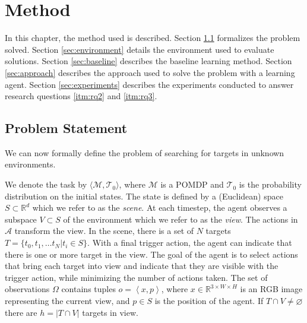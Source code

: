 \chapter{Method}
\label{cha:method}


% 

In this chapter, the method used is described.
Section \ref{sec:problem} formalizes the problem solved.
Section \ref{sec:environment} details the environment used to evaluate solutions.
Section \ref{sec:baseline} describes the baseline learning method.
Section \ref{sec:approach} describes the approach used to solve the problem with a learning agent.
Section \ref{sec:experiments} describes the experiments conducted to answer research questions \ref{itm:rq2} and \ref{itm:rq3}.

\section{Problem Statement}
\label{sec:problem}


We can now formally define the problem of searching for targets in unknown environments.

We denote the task by \(\langle \mathcal{M}, \mathcal{T}_0 \rangle\), where \(\mathcal{M}\) is a POMDP and \(\mathcal{T}_0\) is the probability distribution on the initial states.
The state is defined by a (Euclidean) space \(S \subset \mathbb{R}^d\) which we refer to as the \textit{scene}.
At each timestep, the agent observes a subspace \(V \subset S\) of the environment which we refer to as the \textit{view}.
The actions in \(\mathcal{A}\) transform the view.
In the scene, there is a set of \(N\) targets \(T = \{t_0, t_1, \dots t_N | t_i \in S\}\).
With a final trigger action, the agent can indicate that there is one or more target in the view.
The goal of the agent is to select actions that bring each target into view and indicate that they are visible with the trigger action, while minimizing the number of actions taken.
The set of observations \(\Omega\) contains tuples \(o = \left\langle x, p \right\rangle\),
where \(x \in \mathbb{R}^{3 \times W \times H}\) is an RGB image representing the current view, and \(p \in S\) is the position of the agent.
If \(T \cap V \neq \varnothing\) there are \(h = \left\lvert T \cap V \right\rvert\) targets in view.

